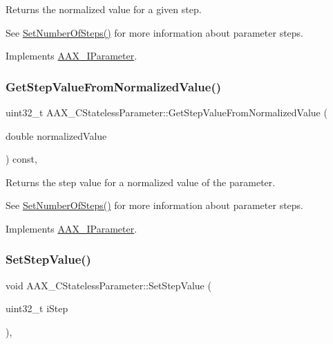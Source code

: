 Returns the normalized value for a given step. 

See \mbox{\hyperlink{a01541_a5bf5527cf5ef918923dd21f4ebee6179}{Set\+Number\+Of\+Steps()}} for more information about parameter steps. 

Implements \mbox{\hyperlink{a01857_a793cc6ffe2688f26e2afb8277e07ade6}{A\+A\+X\+\_\+\+I\+Parameter}}.

\mbox{\label{a01541_a14bbab3f603a2731518d7936eebdea4e}} 
\subsubsection{\texorpdfstring{GetStepValueFromNormalizedValue()}{GetStepValueFromNormalizedValue()}}
{\footnotesize\ttfamily uint32\+\_\+t A\+A\+X\+\_\+\+C\+Stateless\+Parameter\+::\+Get\+Step\+Value\+From\+Normalized\+Value (\begin{DoxyParamCaption}\item[{double}]{normalized\+Value }\end{DoxyParamCaption}) const\hspace{0.3cm}{\ttfamily [inline]}, {\ttfamily [virtual]}}



Returns the step value for a normalized value of the parameter. 

See \mbox{\hyperlink{a01541_a5bf5527cf5ef918923dd21f4ebee6179}{Set\+Number\+Of\+Steps()}} for more information about parameter steps. 

Implements \mbox{\hyperlink{a01857_a5ff847bf1730bda6c91189aba8969557}{A\+A\+X\+\_\+\+I\+Parameter}}.

\mbox{\label{a01541_ad6393ac5ca6f3cf099b59853313db770}} 
\subsubsection{\texorpdfstring{SetStepValue()}{SetStepValue()}}
{\footnotesize\ttfamily void A\+A\+X\+\_\+\+C\+Stateless\+Parameter\+::\+Set\+Step\+Value (\begin{DoxyParamCaption}\item[{uint32\+\_\+t}]{i\+Step }\end{DoxyParamCaption})\hspace{0.3cm}{\ttfamily [inline]}, {\ttfamily [virtual]}}



